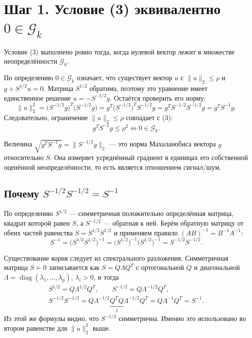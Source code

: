 \documentclass[11pt,a4paper]{article}
\newcommand{\G}{\mathcal{G}_k}
\newcommand{\Shalf}{S^{1/2}}
\newcommand{\Smhalf}{S^{-1/2}}
\newcommand{\norm}[1]{\lVert #1\rVert_2}
\DeclareMathOperator{\diag}{diag}
\begin{document}
\section*{Шаг 1. Условие (3) эквивалентно $0 \in \G$}

Условие (3) выполнено ровно тогда, когда нулевой вектор лежит в множестве
неопределённости $\G$.

По определению $0 \in \G$ означает, что существует вектор $u$ с $\norm{u} \le \rho$
и $g + \Shalf u = 0$. Матрица $\Shalf$ обратима, поэтому это уравнение имеет
единственное решение $u = -\Smhalf g$. Остаётся проверить его норму:
\begin{equation*}
\norm{u}^2 = \big(\Smhalf g\big)^T\big(\Smhalf g\big)
= g^T\big(\Smhalf\big)^T\Smhalf g = g^T \Smhalf\Smhalf g = g^TS^{-1}g .
\end{equation*}
Следовательно, ограничение $\norm{u} \le \rho$ совпадает с (3):
\begin{equation*}
g^TS^{-1}g \le \rho^2 \iff 0 \in \G .
\end{equation*}

Величина $\sqrt{g^TS^{-1}g} = \norm{\Smhalf g}$ — это норма Махаланобиса вектора
$g$ относительно $S$. Она измеряет усреднённый градиент в единицах его собственной
оценённой неопределённости, то есть является отношением сигнал/шум.

\subsection*{Почему $\Smhalf\Smhalf = S^{-1}$}

По определению $\Shalf$ — симметричная положительно определённая матрица, квадрат
которой равен $S$, а $\Smhalf$ — обратная к ней. Берём обратную матрицу от обеих
частей равенства $S = \Shalf\Shalf$ и применяем правило $(AB)^{-1} = B^{-1}A^{-1}$:
\begin{equation*}
S^{-1} = \big(\Shalf\Shalf\big)^{-1} = \big(\Shalf\big)^{-1}\big(\Shalf\big)^{-1}
= \Smhalf\Smhalf .
\end{equation*}

Существование корня следует из спектрального разложения. Симметричная матрица
$S \succ 0$ записывается как $S = Q\Lambda Q^T$ с ортогональной $Q$ и диагональной
$\Lambda = \diag(\lambda_1,\dots,\lambda_p)$, $\lambda_i > 0$, и тогда
\begin{gather*}
\Shalf = Q\Lambda^{1/2}Q^T, \qquad \Smhalf = Q\Lambda^{-1/2}Q^T, \\
\Smhalf\Smhalf = Q\Lambda^{-1/2}\underbrace{Q^TQ}_{I}\Lambda^{-1/2}Q^T
= Q\Lambda^{-1}Q^T = S^{-1}.
\end{gather*}
Из этой же формулы видно, что $\Smhalf$ симметрична. Именно это использовано во
втором равенстве для $\norm{u}^2$ выше.
\end{document}
